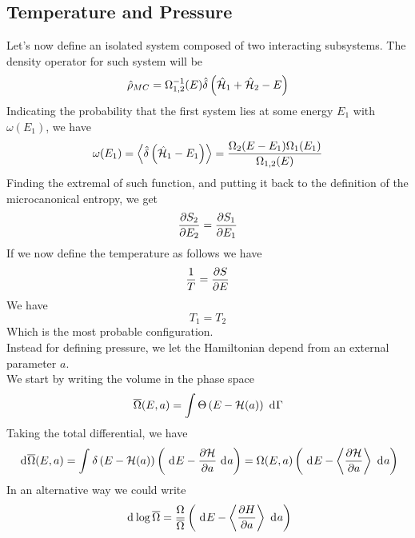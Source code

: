 \documentclass[../qm.tex]{subfiles}
\begin{document}
		\subsection{Temperature and Pressure}
		Let's now define an isolated system composed of two interacting subsystems. The density operator for such system will be
		\begin{equation}
			\hat{\rho}_{MC}=\Omega_{1,2}^{-1}(E)\hat{\delta}\left( \hat{\mathcal{H}}_1+\hat{\mathcal{H}}_2-E \right)
			\label{eq:microcanonicalrho}
		\end{equation}
		Indicating the probability that the first system lies at some energy $E_1$ with $\omega(E_1)$, we have
		\begin{equation}
			\omega(E_1)=\expval{\hat{\delta}\left( \hat{\mathcal{H}}_1-E_1 \right)}=\frac{\Omega_2(E-E_1)\Omega_1(E_1)}{\Omega_{1,2}(E)}
			\label{eq:omegaE1}
		\end{equation}
		Finding the extremal of such function, and putting it back to the definition of the microcanonical entropy, we get
		\begin{equation}
			\pdv{S_2}{E_2}=\pdv{S_1}{E_1}
			\label{eq:closedformentropy}
		\end{equation}
		If we now define the temperature as follows we have
		\begin{equation}
			\frac{1}{T}=\pdv{S}{E}
			\label{eq:temperaturedef}
		\end{equation}
		We have
		\begin{equation*}
			T_1=T_2
		\end{equation*}
		Which is the most probable configuration.\\
		Instead for defining pressure, we let the Hamiltonian depend from an external parameter $a$.\\
		We start by writing the volume in the phase space
		\begin{equation}
			\overline{\Omega}(E,a)=\int\Theta\left( E-\mathcal{H}(a) \right)\ \mathrm{d}^{}\Gamma
			\label{eq:omegabarpressure}
		\end{equation}
		Taking the total differential, we have
		\begin{equation}
			\ \mathrm{d}^{}\overline{\Omega}(E,a)=\int_{}^{}\delta\left( E-\mathcal{H}(a) \right)\left( \ \mathrm{d}^{}E-\pdv{\mathcal{H}}{a}\ \mathrm{d}^{}a \right)=\Omega(E,a)\left( \ \mathrm{d}^{}E-\expval{\pdv{\mathcal{H}}{a}}\ \mathrm{d}^{}a \right)
			\label{eq:diffccOmegaEpressure}
		\end{equation}
		In an alternative way we could write
		\begin{equation*}
			\ \mathrm{d}^{}\log\overline{\Omega}=\frac{\Omega}{\overline{\Omega}}\left( \ \mathrm{d}^{}E-\expval{\pdv{H}{a}}\ \mathrm{d}^{}a \right)
		\end{equation*}
\end{document}
